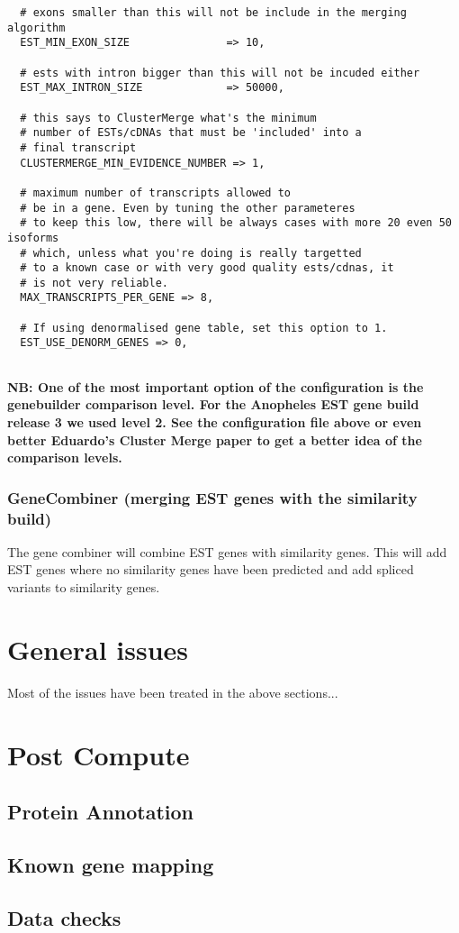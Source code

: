 \documentclass[a4paper,10pt]{article}
\begin{document}
\begin{verbatim}
  # exons smaller than this will not be include in the merging algorithm
  EST_MIN_EXON_SIZE               => 10,
  
  # ests with intron bigger than this will not be incuded either
  EST_MAX_INTRON_SIZE             => 50000,
  
  # this says to ClusterMerge what's the minimum
  # number of ESTs/cDNAs that must be 'included' into a
  # final transcript
  CLUSTERMERGE_MIN_EVIDENCE_NUMBER => 1,
  
  # maximum number of transcripts allowed to 
  # be in a gene. Even by tuning the other parameteres
  # to keep this low, there will be always cases with more 20 even 50 isoforms
  # which, unless what you're doing is really targetted
  # to a known case or with very good quality ests/cdnas, it
  # is not very reliable.
  MAX_TRANSCRIPTS_PER_GENE => 8,
  
  # If using denormalised gene table, set this option to 1.
  EST_USE_DENORM_GENES => 0,
            
\end{verbatim}

\bf{NB:} One of the most important option of the configuration is the genebuilder comparison level. For the Anopheles EST gene build release 3 we used level 2. See the configuration file above or even better Eduardo's Cluster Merge paper to get a better idea of the comparison levels.

\subsubsection{GeneCombiner (merging EST genes with the similarity build)}
The gene combiner will combine EST genes with similarity genes. This will add EST genes where no similarity genes have been predicted and add spliced variants to similarity genes.

\section{General issues}
Most of the issues have been treated in the above sections...
\section{Post Compute}
\subsection{Protein Annotation}
\subsection{Known gene mapping}
\subsection{Data checks}
\end{document}
